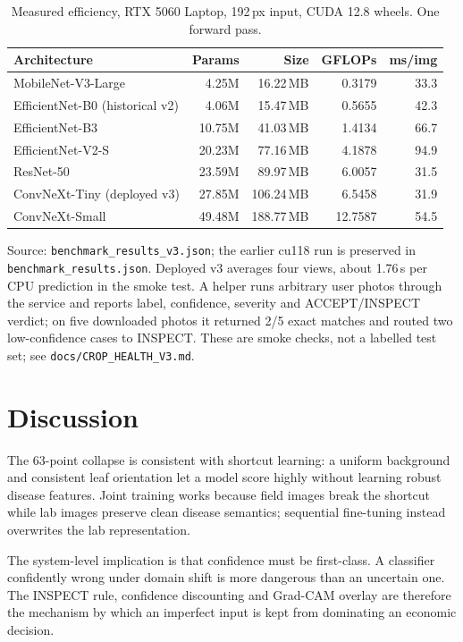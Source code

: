 \documentclass[journal,twocolumn,10pt]{IEEEtran}
\begin{document}
\begin{table}[t]
\centering
\caption{Measured efficiency, RTX 5060 Laptop, 192\,px input, CUDA 12.8 wheels. One forward pass.}
\label{tab:eff}
\begin{tabular}{@{}lrrrr@{}}
\toprule
Architecture & Params & Size & GFLOPs & ms/img \\
\midrule
MobileNet-V3-Large & 4.25M & 16.22\,MB & 0.3179 & 33.3 \\
EfficientNet-B0 (historical v2) & 4.06M & 15.47\,MB & 0.5655 & 42.3 \\
EfficientNet-B3 & 10.75M & 41.03\,MB & 1.4134 & 66.7 \\
EfficientNet-V2-S & 20.23M & 77.16\,MB & 4.1878 & 94.9 \\
ResNet-50 & 23.59M & 89.97\,MB & 6.0057 & 31.5 \\
ConvNeXt-Tiny (deployed v3) & 27.85M & 106.24\,MB & 6.5458 & 31.9 \\
ConvNeXt-Small & 49.48M & 188.77\,MB & 12.7587 & 54.5 \\
\bottomrule
\end{tabular}
\end{table}

Source: \texttt{benchmark\_results\_v3.json}; the earlier cu118 run is preserved in
\texttt{benchmark\_results.json}. Deployed v3 averages four views, about 1.76\,s per CPU
prediction in the smoke test. A helper runs arbitrary user photos through the service and reports
label, confidence, severity and ACCEPT/INSPECT verdict; on five downloaded photos it returned 2/5
exact matches and routed two low-confidence cases to INSPECT. These are smoke checks, not a labelled
test set; see \texttt{docs/CROP\_HEALTH\_V3.md}.

\section{Discussion}

The 63-point collapse is consistent with shortcut learning: a uniform background and consistent
leaf orientation let a model score highly without learning robust disease features. Joint training
works because field images break the shortcut while lab images preserve clean disease semantics;
sequential fine-tuning instead overwrites the lab representation.

The system-level implication is that confidence must be first-class. A classifier confidently
wrong under domain shift is more dangerous than an uncertain one. The INSPECT rule, confidence
discounting and Grad-CAM overlay are therefore the mechanism by which an imperfect input is kept
from dominating an economic decision.
\end{document}

